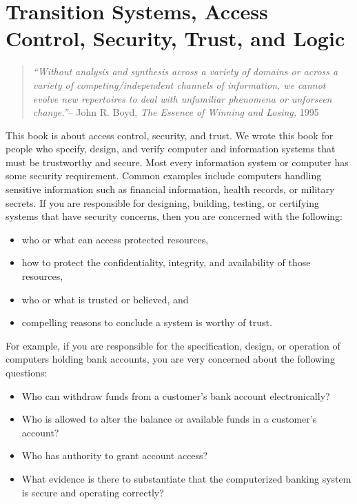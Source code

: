 \chapter{Transition Systems, Access Control, Security, Trust, and
  Logic}


\begin{quote}
  \emph{``Without analysis and synthesis across a variety of domains
    or across a variety of competing/independent channels of
    information, we cannot evolve new repertoires to deal with
    unfamiliar phenomena or unforseen change.''}\hfill{-- John
    R. Boyd, \emph{The Essence of Winning and Losing,} 1995}
\end{quote}

This book is about access control, security, and trust. We wrote this
book for people who specify, design, and verify computer and
information systems that must be trustworthy and secure. Most every
information system or computer has some security requirement.  Common
examples include computers handling sensitive information such as
financial information, health records, or military secrets. If you are
responsible for designing, building, testing, or certifying systems
that have security concerns, then you are concerned with the
following:
\begin{itemize}
\item who or what can access protected resources,
\item how to protect the confidentiality, integrity, and availability
  of those resources,
\item who or what is trusted or believed, and
\item compelling reasons to conclude a system is worthy of trust.
\end{itemize}

For example, if you are responsible for the specification, design, or
operation of computers holding bank accounts, you are very concerned
about the following questions:
\begin{itemize}
\item Who can withdraw funds from a customer's bank account
  electronically?
\item Who is allowed to alter the balance or available funds in a
  customer's account?
\item Who has authority to grant account access?
\item What evidence is there to substantiate that the computerized
  banking system is secure and operating correctly?
\end{itemize}

